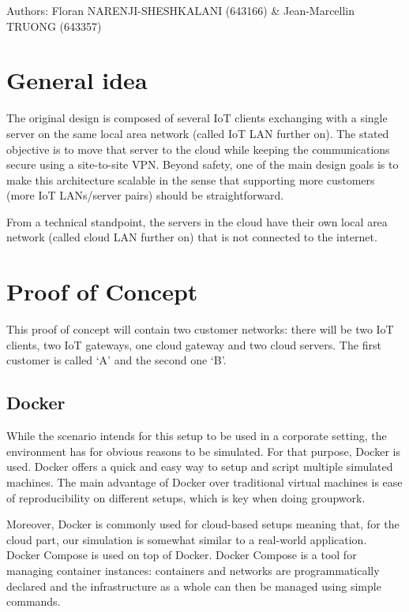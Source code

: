 \documentclass[paper=a4, fontsize=11pt]{scrartcl}
\author{Floran NARENJI-SHESHKALANI \& Jean-Marcellin TRUONG}
\begin{document}
Authors: Floran NARENJI-SHESHKALANI (643166) \& Jean-Marcellin TRUONG (643357)

\section{General idea}

The original design is composed of several IoT clients exchanging with a single
server on the same local area network (called IoT LAN further on).
The stated objective is to move that server to the cloud while keeping the
communications secure using a site-to-site VPN\@.
Beyond safety, one of the main design goals is to make this architecture
scalable in the sense that supporting more customers (more IoT LANs/server
pairs) should be straightforward.

From a technical standpoint, the servers in the cloud have their own local area
network (called cloud LAN further on) that is not connected to the internet.

\section{Proof of Concept}

This proof of concept will contain two customer networks: there will be two IoT
clients, two IoT gateways, one cloud gateway and two cloud servers.
The first customer is called `A' and the second one `B'.

\subsection{Docker}

While the scenario intends for this setup to be used in a corporate setting, the
environment has for obvious reasons to be simulated.
For that purpose, Docker is used. Docker offers a quick and easy way to setup
and script multiple simulated machines.
The main advantage of Docker over traditional virtual machines is ease of
reproducibility on different setups, which is key when doing groupwork.

Moreover, Docker is commonly used for cloud-based setups meaning that, for the
cloud part, our simulation is somewhat similar to a real-world application.
\\

Docker Compose is used on top of Docker. Docker Compose is a tool for managing
container instances: containers and networks are programmatically declared and
the infrastructure as a whole can then be managed using simple commands.
\end{document}
